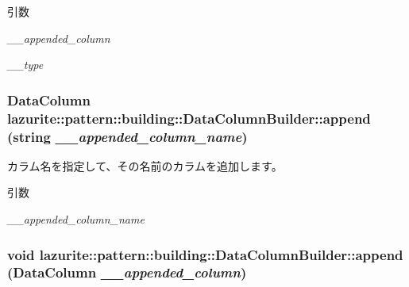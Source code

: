 \begin{DoxyParams}{引数}
\item[{\em \_\-\_\-appended\_\-column}]\item[{\em \_\-\_\-type}]\end{DoxyParams}
\hypertarget{classlazurite_1_1pattern_1_1building_1_1_data_column_builder_aadbc572ee7e5626046051abf63b37cdd}{
\subsubsection[{append}]{\setlength{\rightskip}{0pt plus 5cm}DataColumn lazurite::pattern::building::DataColumnBuilder::append (string {\em \_\-\_\-appended\_\-column\_\-name})}}
\label{classlazurite_1_1pattern_1_1building_1_1_data_column_builder_aadbc572ee7e5626046051abf63b37cdd}


カラム名を指定して、その名前のカラムを追加します。 
\begin{DoxyParams}{引数}
\item[{\em \_\-\_\-appended\_\-column\_\-name}]\end{DoxyParams}
\hypertarget{classlazurite_1_1pattern_1_1building_1_1_data_column_builder_abad09561aa109d0bd234df7ee848e272}{
\subsubsection[{append}]{\setlength{\rightskip}{0pt plus 5cm}void lazurite::pattern::building::DataColumnBuilder::append (DataColumn {\em \_\-\_\-appended\_\-column})}}
\label{classlazurite_1_1pattern_1_1building_1_1_data_column_builder_abad09561aa109d0bd234df7ee848e272}


